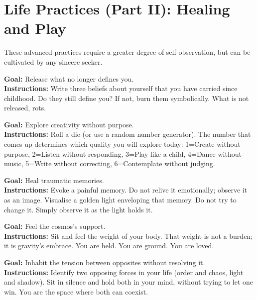 \documentclass[12pt,a4paper,openany]{book}
\begin{document}
\chapter{Life Practices (Part II): Healing and Play}
\label{chap:practicas_II}

These advanced practices require a greater degree of self-observation, but can be cultivated by any sincere seeker.


\begin{practica}[title={Practice 7: Burning Old Certainties}]
\textbf{Goal:} Release what no longer defines you. \\
\textbf{Instructions:} Write three beliefs about yourself that you have carried since childhood. Do they still define you? If not, burn them symbolically. What is not released, rots.
\end{practica}


\begin{practica}[title={Practice 8: The Dice Game}]
\textbf{Goal:} Explore creativity without purpose. \\
\textbf{Instructions:} Roll a die (or use a random number generator). The number that comes up determines which quality you will explore today: 1=Create without purpose, 2=Listen without responding, 3=Play like a child, 4=Dance without music, 5=Write without correcting, 6=Contemplate without judging.
\end{practica}


\begin{practica}[title={Practice 9: Memory Tuning}]
\textbf{Goal:} Heal traumatic memories. \\
\textbf{Instructions:} Evoke a painful memory. Do not relive it emotionally; observe it as an image. Visualise a golden light enveloping that memory. Do not try to change it. Simply observe it as the light holds it.
\end{practica}


\begin{practica}[title={Practice 10: Empathic Gravity}]
\textbf{Goal:} Feel the cosmos's support. \\
\textbf{Instructions:} Sit and feel the weight of your body. That weight is not a burden; it is gravity's embrace. You are held. You are ground. You are loved.
\end{practica}


\begin{practica}[title={Practice 11: The Threshold Dance}]
\textbf{Goal:} Inhabit the tension between opposites without resolving it. \\
\textbf{Instructions:} Identify two opposing forces in your life (order and chaos, light and shadow). Sit in silence and hold both in your mind, without trying to let one win. You are the space where both can coexist.
\end{practica}
\end{document}
